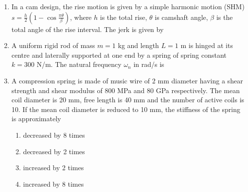 \documentclass[journal,12pt,onecolumn]{IEEEtran}
\begin{document}
\begin{enumerate}[resume]
    \item In a cam design, the rise motion is given by a simple harmonic motion (SHM) $s=\frac{h}{2}(1-\cos\frac{\pi\theta}{\beta})$, where $h$ is the total rise, $\theta$ is camshaft angle, $\beta$ is the total angle of the rise interval. The jerk is given by
          \begin{enumerate}
          \end{enumerate}

    \item A uniform rigid rod of mass $m=1$ kg and length $L=1$ m is hinged at its centre and laterally supported at one end by a spring of spring constant $k=300$ N/m. The natural frequency $\omega_n$ in rad/s is
          \begin{enumerate}
          \end{enumerate}

    \item A compression spring is made of music wire of 2 mm diameter having a shear strength and shear modulus of 800 MPa and 80 GPa respectively. The mean coil diameter is 20 mm, free length is 40 mm and the number of active coils is 10. If the mean coil diameter is reduced to 10 mm, the stiffness of the spring is approximately
          \begin{enumerate}
              \item decreased by 8 times
              \item decreased by 2 times
              \item increased by 2 times
              \item increased by 8 times
          \end{enumerate}


\end{enumerate}
\end{document}
